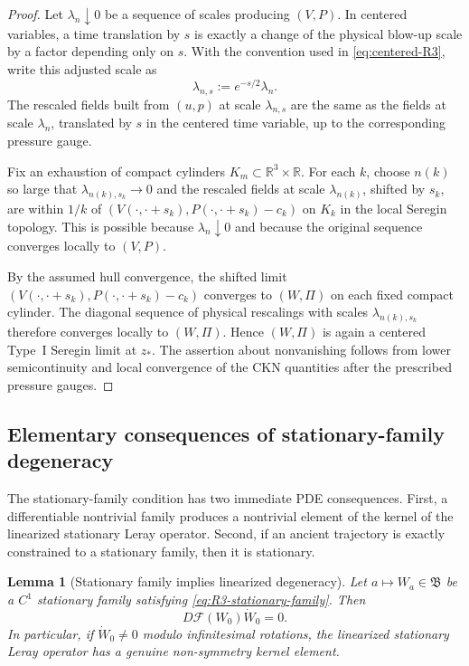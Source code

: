 \documentclass[11pt]{amsart}
\numberwithin{equation}{section}
\theoremstyle{plain}
\newtheorem{lemma}[theorem]{Lemma}
\theoremstyle{definition}
\theoremstyle{remark}
\begin{document}
\begin{proof}
Let \(\lambda_n\downarrow0\) be a sequence of scales producing \((V,P)\).  In
centered variables, a time translation by \(s\) is exactly a change of the
physical blow-up scale by a factor depending only on \(s\).  With the convention
used in \eqref{eq:centered-R3}, write this adjusted scale as
\begin{equation}\label{eq:R3-adjusted-scale}
   \lambda_{n,s}:=e^{-s/2}\lambda_n .
\end{equation}
The rescaled fields built from \((u,p)\) at scale \(\lambda_{n,s}\) are the same
as the fields at scale \(\lambda_n\), translated by \(s\) in the centered time
variable, up to the corresponding pressure gauge.

Fix an exhaustion of compact cylinders \(K_m\subset\mathbb R^3\times\mathbb R\).
For each \(k\), choose \(n(k)\) so large that \(\lambda_{n(k),s_k}\to0\) and the
rescaled fields at scale \(\lambda_{n(k)}\), shifted by \(s_k\), are within
\(1/k\) of \((V(\cdot,\cdot+s_k),P(\cdot,\cdot+s_k)-c_k)\) on \(K_k\) in the
local Seregin topology.  This is possible because \(\lambda_n\downarrow0\) and
because the original sequence converges locally to \((V,P)\).

By the assumed hull convergence, the shifted limit
\((V(\cdot,\cdot+s_k),P(\cdot,\cdot+s_k)-c_k)\) converges to \((W,\Pi)\) on each
fixed compact cylinder.  The diagonal sequence of physical rescalings with
scales \(\lambda_{n(k),s_k}\) therefore converges locally to \((W,\Pi)\).  Hence
\((W,\Pi)\) is again a centered Type~I Seregin limit at \(z_*\).  The assertion
about nonvanishing follows from lower semicontinuity and local convergence of
the CKN quantities after the prescribed pressure gauges.
\end{proof}

\subsection{Elementary consequences of stationary-family degeneracy}

The stationary-family condition has two immediate PDE consequences.  First, a differentiable
nontrivial family produces a nontrivial element of the kernel of the linearized
stationary Leray operator.  Second, if an ancient trajectory is exactly
constrained to a stationary family, then it is stationary.

\begin{lemma}[Stationary family implies linearized degeneracy]
\label{lem:R3-family-kernel}
Let \(a\mapsto W_a\in\mathfrak B\) be a \(C^1\) stationary family satisfying
\eqref{eq:R3-stationary-family}.  Then
\begin{equation}\label{eq:R3-kernel}
   D\mathcal F(W_0)\dot W_0=0 .
\end{equation}
In particular, if \(\dot W_0\ne0\) modulo infinitesimal rotations, the
linearized stationary Leray operator has a genuine non-symmetry kernel element.
\end{lemma}
\end{document}
